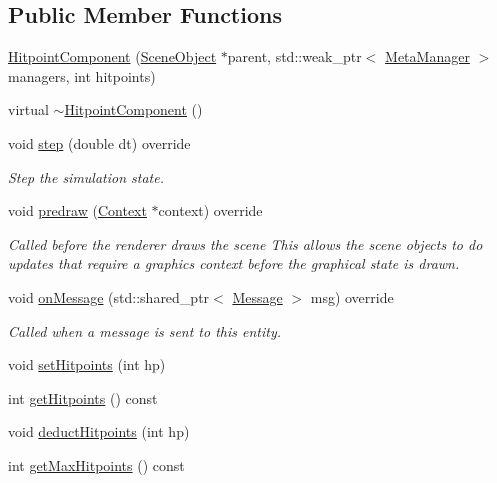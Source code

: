 \subsection*{Public Member Functions}
\begin{DoxyCompactItemize}
\item 
\hyperlink{class_hitpoint_component_aa2c60ad44ae7a6cb4afdc00e6ab58ae0}{Hitpoint\+Component} (\hyperlink{class_scene_object}{Scene\+Object} $\ast$parent, std\+::weak\+\_\+ptr$<$ \hyperlink{class_meta_manager}{Meta\+Manager} $>$ managers, int hitpoints)
\item 
virtual \hyperlink{class_hitpoint_component_ac860c282a3524863215e0e21a9a2c18d}{$\sim$\+Hitpoint\+Component} ()
\item 
void \hyperlink{class_hitpoint_component_ab293fcc4d167a4fa9cd27cbf1ba42018}{step} (double dt) override
\begin{DoxyCompactList}\small\item\em Step the simulation state. \end{DoxyCompactList}\item 
void \hyperlink{class_hitpoint_component_a3210abfca24e1bc9827f56533ab798af}{predraw} (\hyperlink{class_context}{Context} $\ast$context) override
\begin{DoxyCompactList}\small\item\em Called before the renderer draws the scene This allows the scene objects to do updates that require a graphics context before the graphical state is drawn. \end{DoxyCompactList}\item 
void \hyperlink{class_hitpoint_component_a86ab4e66b47a675b56c0c3eaa8ff07d9}{on\+Message} (std\+::shared\+\_\+ptr$<$ \hyperlink{class_message}{Message} $>$ msg) override
\begin{DoxyCompactList}\small\item\em Called when a message is sent to this entity. \end{DoxyCompactList}\item 
void \hyperlink{class_hitpoint_component_a7bd62f6391f68e2c8d4501372bcaf87a}{set\+Hitpoints} (int hp)
\item 
int \hyperlink{class_hitpoint_component_ae61e3e3d6c63ea20d4a54bff2e24a488}{get\+Hitpoints} () const 
\item 
void \hyperlink{class_hitpoint_component_a26d9300824f96d8dc70b0d1a6d6b74de}{deduct\+Hitpoints} (int hp)
\item 
int \hyperlink{class_hitpoint_component_a2e81eb14804005b2956f9d21caa912f0}{get\+Max\+Hitpoints} () const 
\end{DoxyCompactItemize}
